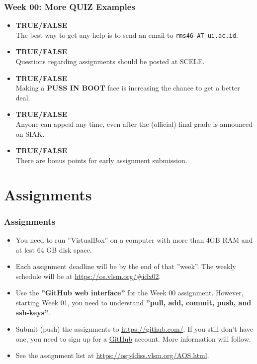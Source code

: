 \documentclass[aspectratio=169, xcolor=table, notheorems, hyperref={pdfpagelabels=false}]{beamer}
\begin{document}
\begin{frame}
\frametitle{Week 00: More QUIZ Examples}
\begin{itemize}
\item \textbf{TRUE/FALSE}\\
      The best way to get any help is to send an email to \texttt{rms46 AT ui.ac.id}.
\item \textbf{TRUE/FALSE}\\
      Questions regarding assignments should be posted at SCELE.
\item \textbf{TRUE/FALSE}\\
      Making a \textbf{PUSS IN BOOT} face is increasing the chance to get a better deal.
\item \textbf{TRUE/FALSE}\\
      Anyone can appeal any time, even after the (official) final grade is announced on SIAK.
\item \textbf{TRUE/FALSE}\\
      There are bonus points for early assignment submission.
\end{itemize}
\end{frame}

\section{Assignments}
\begin{frame}[fragile]
\frametitle{Assignments}
\begin{itemize}
\item You need to run ''VirtualBox'' on a computer with more than 4GB RAM and at lest 64 GB disk space.
\item Each assignment deadline will be by the end of that ''week''. 
      The weekly schedule will be at \url{https://os.vlsm.org/\#idx02}.
\item Use the \textbf{''GitHub web interface''} for the Week 00 assignment.
      However, starting Week 01, you need to understand \textbf{''pull, add, commit, push, and ssh-keys''}.
\item Submit (push) the assignments to \url{https://github.com/}.
      If you still don't have one, you need to sign up for a \href{https://github.com/}{GitHub} account.
      More information will follow.
\item See the assignment list at \url{https://osp4diss.vlsm.org/AOS.html}.
\end{itemize}
\end{frame}
\end{document}
